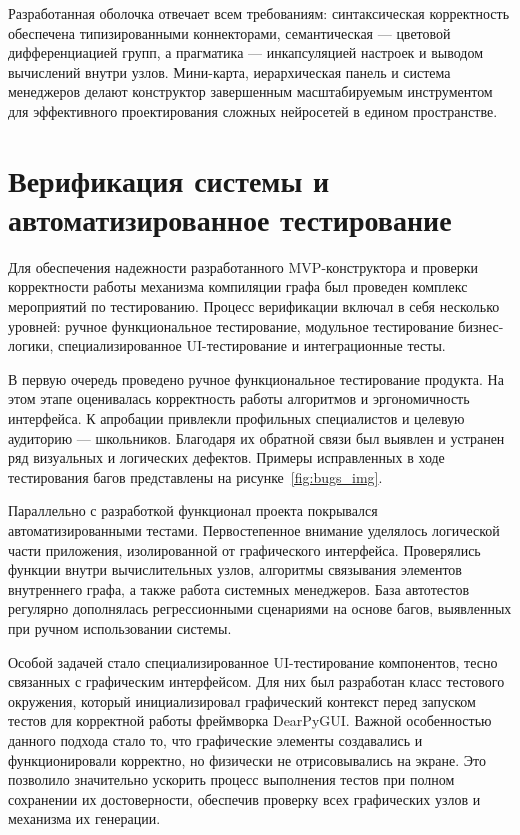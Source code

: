 \documentclass{report}
\begin{document}
Разработанная оболочка отвечает всем требованиям: синтаксическая корректность обеспечена типизированными коннекторами, семантическая — цветовой дифференциацией групп, а прагматика — инкапсуляцией настроек и выводом вычислений внутри узлов. Мини-карта, иерархическая панель и система менеджеров делают конструктор завершенным масштабируемым инструментом для эффективного проектирования сложных нейросетей в едином пространстве.


\section{Верификация системы и автоматизированное тестирование}

Для обеспечения надежности разработанного MVP-конструктора и проверки корректности работы механизма компиляции графа был проведен комплекс мероприятий по тестированию. Процесс верификации включал в себя несколько уровней: ручное функциональное тестирование, модульное тестирование бизнес-логики, специализированное UI-тестирование и интеграционные тесты.

    В первую очередь проведено ручное функциональное тестирование продукта. На этом этапе оценивалась корректность работы алгоритмов и эргономичность интерфейса. К апробации привлекли профильных специалистов и целевую аудиторию — школьников. Благодаря их обратной связи был выявлен и устранен ряд визуальных и логических дефектов. Примеры исправленных в ходе тестирования багов представлены на рисунке~\ref{fig:bugs_img}.


Параллельно с разработкой функционал проекта покрывался автоматизированными тестами. Первостепенное внимание уделялось логической части приложения, изолированной от графического интерфейса. Проверялись функции внутри вычислительных узлов, алгоритмы связывания элементов внутреннего графа, а также работа системных менеджеров. База автотестов регулярно дополнялась регрессионными сценариями на основе багов, выявленных при ручном использовании системы.

Особой задачей стало специализированное UI-тестирование компонентов, тесно связанных с графическим интерфейсом. Для них был разработан класс тестового окружения, который инициализировал графический контекст перед запуском тестов для корректной работы фреймворка DearPyGUI. Важной особенностью данного подхода стало то, что графические элементы создавались и функционировали корректно, но физически не отрисовывались на экране. Это позволило значительно ускорить процесс выполнения тестов при полном сохранении их достоверности, обеспечив проверку всех графических узлов и механизма их генерации.
\end{document}
